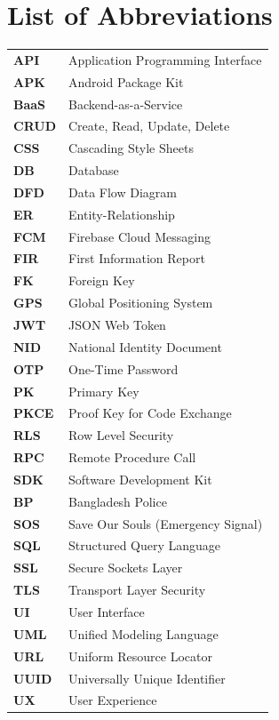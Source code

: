 \documentclass[12pt, a4paper, twoside, openany]{report}
\begin{document}
\chapter*{List of Abbreviations}
\begin{table}[ht]
\begin{tabularx}{\textwidth}{lX}
\textbf{API} & Application Programming Interface \\
\textbf{APK} & Android Package Kit \\
\textbf{BaaS} & Backend-as-a-Service \\
\textbf{CRUD} & Create, Read, Update, Delete \\
\textbf{CSS} & Cascading Style Sheets \\
\textbf{DB} & Database \\
\textbf{DFD} & Data Flow Diagram \\
\textbf{ER} & Entity-Relationship \\
\textbf{FCM} & Firebase Cloud Messaging \\
\textbf{FIR} & First Information Report \\
\textbf{FK} & Foreign Key \\
\textbf{GPS} & Global Positioning System \\
\textbf{JWT} & JSON Web Token \\
\textbf{NID} & National Identity Document \\
\textbf{OTP} & One-Time Password \\
\textbf{PK} & Primary Key \\
\textbf{PKCE} & Proof Key for Code Exchange \\
\textbf{RLS} & Row Level Security \\
\textbf{RPC} & Remote Procedure Call \\
\textbf{SDK} & Software Development Kit \\
\textbf{BP} & Bangladesh Police \\
\textbf{SOS} & Save Our Souls (Emergency Signal) \\
\textbf{SQL} & Structured Query Language \\
\textbf{SSL} & Secure Sockets Layer \\
\textbf{TLS} & Transport Layer Security \\
\textbf{UI} & User Interface \\
\textbf{UML} & Unified Modeling Language \\
\textbf{URL} & Uniform Resource Locator \\
\textbf{UUID} & Universally Unique Identifier \\
\textbf{UX} & User Experience \\
\end{tabularx}
\end{table}
\clearpage
\end{document}
